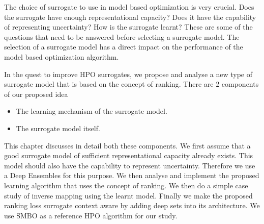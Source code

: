 \documentclass[12pt, twoside, ngerman]{report}
\begin{document}

The choice of surrogate to use in model based optimization is very crucial.
Does the surrogate have enough representational capacity?
Does it have the capability of representing uncertainty?
How is the surrogate learnt?
These are some of the questions that need to be answered before selecting a surrogate model.
The selection of a surrogate model has a direct impact on the performance of the model based optimization algorithm.

In the quest to improve HPO surrogates,  we propose and analyse a new type of surrogate model that is based on the concept of ranking.
There are 2 components of our proposed idea

\begin{itemize}
\item The learning mechanism of the surrogate model.
\item The surrogate model itself.
\end{itemize}

This chapter discusses in detail both these components.
We first assume that a good surrogate model of sufficient representational capacity already exists.
This model should also have the capability to represent uncertainty.
Therefore we use a Deep Ensembles for this purpose.
We then analyse and implement the proposed learning algorithm that uses the concept of ranking.
We then do a simple case study of inverse mapping using the learnt model.
Finally we make the proposed ranking loss surrogate context aware by adding deep sets into its architecture.
We use SMBO as a reference HPO algorithm for our study.
\end{document}
